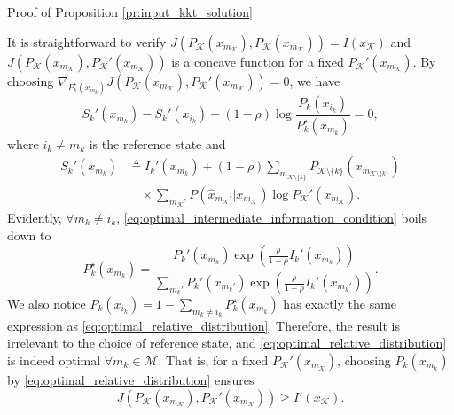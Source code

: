 \documentclass[journal]{IEEEtran}
\begin{document}
\begin{appendix}
\begin{subsection}{Proof of Proposition \ref{pr:input_kkt_solution}}
\begin{figure*}[!b]
		\end{figure*}
		It is straightforward to verify $J \left( P_{\mathcal{K}}(x_{m_{\mathcal{K}}}),P_{\mathcal{K}}(x_{m_{\mathcal{K}}}) \right) = I(x_{\mathcal{K}})$ and $J \left( P_{\mathcal{K}}(x_{m_{\mathcal{K}}}),P_{\mathcal{K}}'(x_{m_{\mathcal{K}}}) \right)$ is a concave function for a fixed $P_{\mathcal{K}}'(x_{m_{\mathcal{K}}})$.
		By choosing $\nabla_{P_k^\star(x_{m_k})} J \left( P_{\mathcal{K}}(x_{m_{\mathcal{K}}}),P_{\mathcal{K}}'(x_{m_{\mathcal{K}}}) \right) = 0$, we have
		\begin{equation}
			S_k'(x_{m_k}) - S_k'(x_{i_k}) + (1 - \rho) \log \frac{P_k(x_{i_k})}{P_k^\star(x_{m_k})} = 0,
			\label{eq:optimal_intermediate_information_condition}
		\end{equation}
		where $i_k \ne m_k$ is the reference state and
		\begin{align}
			S_k'(x_{m_k})
			 & \triangleq I_k'(x_{m_k}) + (1 - \rho) \sum_{m_{\mathcal{K} \setminus \{k\}}} P_{\mathcal{K} \setminus \{k\}}(x_{m_{\mathcal{K} \setminus \{k\}}})\nonumber \\
			 & \quad \times \sum_{m_{\mathcal{K}}'} P(\hat{x}_{m_{\mathcal{K}}'}|x_{m_{\mathcal{K}}}) \log P_{\mathcal{K}}'(x_{m_{\mathcal{K}}}).
		\end{align}
		Evidently, $\forall m_k \ne i_k$, \eqref{eq:optimal_intermediate_information_condition} boils down to
		\begin{equation}
			P_k^\star(x_{m_k}) = \frac{P_k'(x_{m_k}) \exp \left( \frac{\rho}{1 - \rho} I_k'(x_{m_k}) \right)}{\sum_{m_k'} P_k'(x_{m_k'}) \exp \left( \frac{\rho}{1 - \rho} I_k'(x_{m_k'}) \right)}.
			\label{eq:optimal_relative_distribution}
		\end{equation}
		We also notice $P_k(x_{i_k}) = 1 - \sum_{m_k \ne i_k} P_k^\star(x_{m_k})$ has exactly the same expression as \eqref{eq:optimal_relative_distribution}.
		Therefore, the result is irrelevant to the choice of reference state, and \eqref{eq:optimal_relative_distribution} is indeed optimal $\forall m_k \in \mathcal{M}$.
		That is, for a fixed $P_{\mathcal{K}}'(x_{m_{\mathcal{K}}})$, choosing $P_k(x_{m_k})$ by \eqref{eq:optimal_relative_distribution} ensures
		\begin{equation}
			J \left( P_{\mathcal{K}}(x_{m_{\mathcal{K}}}),P_{\mathcal{K}}'(x_{m_{\mathcal{K}}}) \right) \ge I'(x_{\mathcal{K}}).

\end{equation}
\end{subsection}
\end{appendix}
\end{document}
